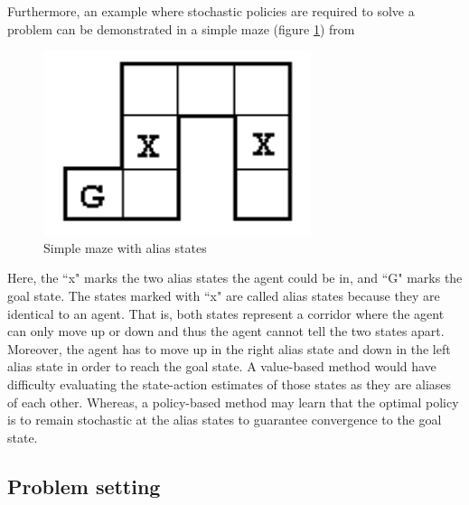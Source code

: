\documentclass[12pt]{report}
\begin{document}
Furthermore, an example where stochastic policies are required to solve a problem can be demonstrated in a simple maze (figure \ref{fig:alias}) from \cite{shani2005resolving}
\begin{figure}[H]
    \center
    \includegraphics[width=0.3\linewidth]{figs/alias_world.png}
    \caption{Simple maze with alias states}
    \label{fig:alias}
\end{figure}
Here, the ``x" marks the two alias states the agent could be in, and ``G" marks the goal state. The states marked with ``x" are called alias states because they are identical to an agent. That is, both states represent a corridor where the agent can only move up or down and thus the agent cannot tell the two states apart. Moreover, the agent has to move up in the right alias state and down in the left alias state in order to reach the goal state. A value-based method would have difficulty evaluating the state-action estimates of those states as they are aliases of each other. Whereas, a policy-based method may learn that the optimal policy is to remain stochastic at the alias states to guarantee convergence to the goal state.

\subsection{Problem setting} \label{sec:policy-grad-bandit}
\end{document}
